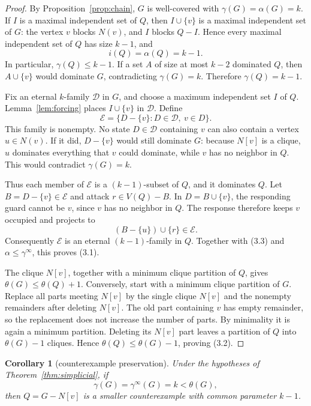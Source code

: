 \documentclass[11pt]{article}
\newtheorem{corollary}[theorem]{Corollary}
\theoremstyle{definition}
\theoremstyle{remark}
\newcommand{\gaminf}{\gamma^{\infty}}
\newcommand{\V}{V}
\begin{document}
\begin{proof}
By Proposition~\ref{prop:chain}, \(G\) is well-covered with
\(\gamma(G)=\alpha(G)=k\).  If \(I\) is a maximal independent set of \(Q\),
then \(I\cup\{v\}\) is a maximal independent set of \(G\): the vertex \(v\)
blocks \(N(v)\), and \(I\) blocks \(Q-I\).  Hence every maximal independent
set of \(Q\) has size \(k-1\), and
\[
  i(Q)=\alpha(Q)=k-1.
\tag{3.3}
\]
In particular, \(\gamma(Q)\leq k-1\).  If a set \(A\) of size at most
\(k-2\) dominated \(Q\), then \(A\cup\{v\}\) would dominate \(G\),
contradicting \(\gamma(G)=k\).  Therefore
\(\gamma(Q)=k-1\).

Fix an eternal \(k\)-family \(\mathcal D\) in \(G\), and choose a maximum
independent set \(I\) of \(Q\).  Lemma~\ref{lem:forcing} places
\(I\cup\{v\}\) in \(\mathcal D\).  Define
\[
  \mathcal E=\{D-\{v\}:D\in\mathcal D,\ v\in D\}.
\tag{3.4}
\]
This family is nonempty.  No state \(D\in\mathcal D\) containing \(v\) can
also contain a vertex \(u\in N(v)\).  If it did, \(D-\{v\}\) would still
dominate \(G\): because \(N[v]\) is a clique, \(u\) dominates everything
that \(v\) could dominate, while \(v\) has no neighbor in \(Q\).  This
would contradict \(\gamma(G)=k\).

Thus each member of \(\mathcal E\) is a \((k-1)\)-subset of \(Q\), and it
dominates \(Q\).  Let \(B=D-\{v\}\in\mathcal E\) and attack
\(r\in\V(Q)-B\).  In \(D=B\cup\{v\}\), the responding guard cannot be
\(v\), since \(v\) has no neighbor in \(Q\).  The response therefore keeps
\(v\) occupied and projects to
\[
  (B-\{u\})\cup\{r\}\in\mathcal E.
\]
Consequently \(\mathcal E\) is an eternal \((k-1)\)-family in \(Q\).
Together with (3.3) and \(\alpha\leq\gaminf\), this proves (3.1).

The clique \(N[v]\), together with a minimum clique partition of \(Q\),
gives \(\theta(G)\leq\theta(Q)+1\).  Conversely, start with a minimum
clique partition of \(G\).  Replace all parts meeting \(N[v]\) by the
single clique \(N[v]\) and the nonempty remainders after deleting \(N[v]\).
The old part containing \(v\) has empty remainder, so the replacement does
not increase the number of parts.  By minimality it is again a minimum
partition.  Deleting its \(N[v]\) part leaves a partition of \(Q\) into
\(\theta(G)-1\) cliques.  Hence
\(\theta(Q)\leq\theta(G)-1\), proving (3.2).
\end{proof}

\begin{corollary}[counterexample preservation]\label{cor:simp-preserve}
Under the hypotheses of Theorem~\ref{thm:simplicial}, if
\[
  \gamma(G)=\gaminf(G)=k<\theta(G),
\]
then \(Q=G-N[v]\) is a smaller counterexample with common parameter \(k-1\).
\end{corollary}
\end{document}
